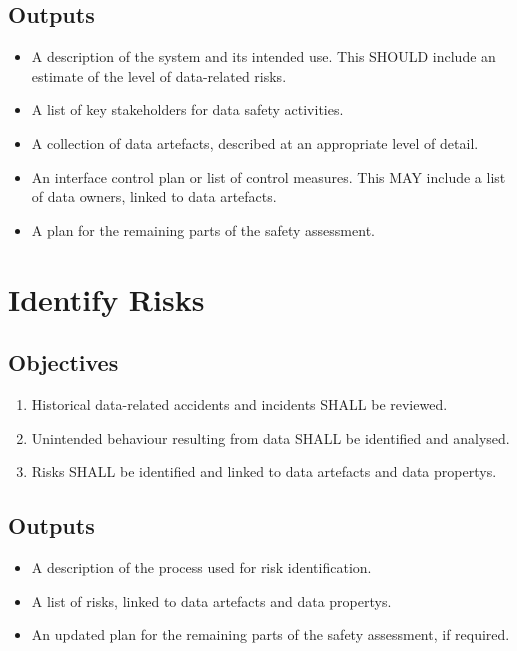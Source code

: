 \subsection{Outputs}
\begin{itemize}
	\item A description of the system and its intended use. This SHOULD include an estimate of the level of data-related risks.
	\item A list of key \glspl{stakeholder} for data safety activities.
	\item A collection of \glspl{data artefact}, described at an appropriate level of detail.
	\item An interface control plan or list of control measures. This MAY include a list of \glspl{data owner}, linked to \glspl{data artefact}.
	\item A plan for the remaining parts of the safety assessment.
\end{itemize}

\section{Identify Risks}
\subsection{Objectives}
\begin{enumerate}[label=\color{dsiwgAccentColour}{2-\arabic*}]
	\item Historical data-related accidents and incidents SHALL be reviewed.
	\item Unintended behaviour resulting from data SHALL be identified and analysed.
	\item Risks SHALL be identified and linked to \glspl{data artefact} and \glspl{data property}.
\end{enumerate}

\subsection{Outputs}
\begin{itemize}
	\item A description of the process used for risk identification.
	\item A list of risks, linked to \glspl{data artefact} and \glspl{data property}.
	\item An updated plan for the remaining parts of the safety assessment, if required.
\end{itemize}

